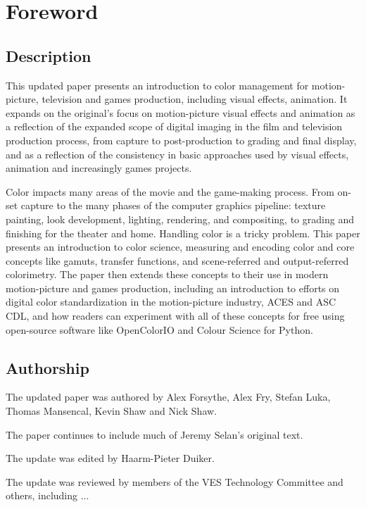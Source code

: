\chapter*{Foreword}

\section*{Description}

This updated paper presents an introduction to color management for motion-picture, television and games production, including visual effects, animation. It expands on the original’s focus on motion-picture visual effects and animation as a reflection of the expanded scope of digital imaging in the film and television production process, from capture to post-production to grading and final display, and as a reflection of the consistency in basic approaches used by visual effects, animation and increasingly games projects.

Color impacts many areas of the movie and the game-making process. From on-set capture to the many phases of the computer graphics pipeline: texture painting, look development, lighting, rendering, and compositing, to grading and finishing for the theater and home. Handling color is a tricky problem. This paper presents an introduction to color science, measuring and encoding color and core concepts like gamuts, transfer functions, and scene-referred and output-referred colorimetry. The paper then extends these concepts to their use in modern motion-picture and games production, including an introduction to efforts on digital color standardization in the motion-picture industry, ACES and ASC CDL, and how readers can experiment with all of these concepts for free using open-source software like OpenColorIO and Colour Science for Python.

\section*{Authorship}

The updated paper was authored by Alex Forsythe, Alex Fry, Stefan Luka, Thomas Mansencal, Kevin Shaw and Nick Shaw. 

The paper continues to include much of Jeremy Selan’s original text.

The update was edited by Haarm-Pieter Duiker.

The update was reviewed by members of the VES Technology Committee and others, including ...

